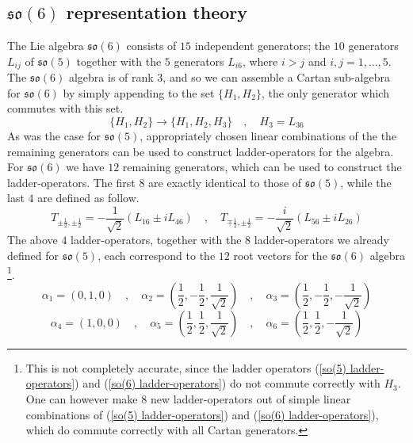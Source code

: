 \subsection{$\mathfrak{so}(6)$ representation theory}
The Lie algebra $\mathfrak{so}(6)$ consists of $15$ independent generators; the $10$ generators $L_{ij}$ of $\mathfrak{so}(5)$ together with the $5$ generators $L_{i6}$, where $i > j$ and $i,j=1,\ldots,5$. The $\mathfrak{so}(6)$ algebra is of rank $3$, and so we can assemble a Cartan sub-algebra for $\mathfrak{so}(6)$ by simply appending to the set $\{H_1, H_2 \}$, the only generator which commutes with this set.
%
%
\begin{equation}\label{Cartan generators so(6)}
\{H_1, H_2 \} \to \{H_1, H_2, H_3 \}
%
\quad , \quad
%
H_3 = L_{36}
\end{equation}
%
%
As was the case for $\mathfrak{so}(5)$, appropriately chosen linear combinations of the the remaining generators can be used to construct ladder-operators for the algebra. For $\mathfrak{so}(6)$ we have $12$ remaining generators, which can be used to construct the ladder-operators. The first $8$ are exactly identical to those of $\mathfrak{so}(5)$, while the last $4$ are defined as follow.
%
%
\begin{equation}\label{so(6) ladder-operators}
T_{\pm \frac{1}{2},\pm \frac{1}{2}}
=
-\frac{1}{\sqrt{2}} (L_{16} \pm i L_{46})
%
\quad , \quad
%
T_{\mp \frac{1}{2},\pm \frac{1}{2}}
=
-\frac{i}{\sqrt{2}} (L_{56} \pm i L_{26})
\end{equation}
%
%
The above $4$ ladder-operators, together with the $8$ ladder-operators we already defined for $\mathfrak{so}(5)$, each correspond to the $12$ root vectors for the $\mathfrak{so}(6)$ algebra \footnote{This is not completely accurate, since the ladder operators (\ref{so(5) ladder-operators}) and (\ref{so(6) ladder-operators}) do not commute correctly with $H_3$. One can however make $8$ new ladder-operators out of simple linear combinations of (\ref{so(5) ladder-operators}) and (\ref{so(6) ladder-operators}), which do commute correctly with all Cartan generators.}.
%
%
\begin{equation}
\alpha_1 = \left(0 , 1, 0 \right)
%
\quad , \quad
%
\alpha_2 = \left( \frac{1}{2} , -\frac{1}{2} , \frac{1}{\sqrt{2}} \right)
%
\quad , \quad
%
\alpha_3 = \left( \frac{1}{2} , -\frac{1}{2} , -\frac{1}{\sqrt{2}} \right)
\end{equation}
%
%
\begin{equation}
\alpha_4 = \left(1, 0, 0 \right)
%
\quad , \quad
%
\alpha_5 = \left( \frac{1}{2} , \frac{1}{2} , \frac{1}{\sqrt{2}} \right)
%
\quad , \quad
%
\alpha_6 = \left( \frac{1}{2} , \frac{1}{2} , -\frac{1}{\sqrt{2}} \right)
\end{equation}
